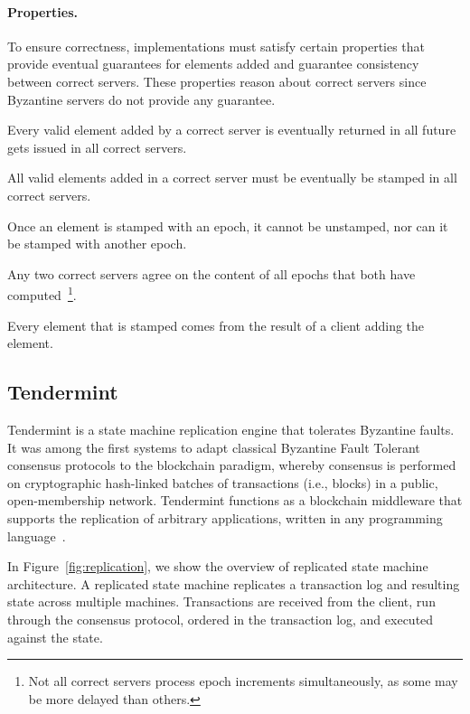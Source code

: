 \paragraph*{Properties.}
To ensure correctness, \setchain implementations must satisfy certain
properties that provide eventual guarantees for elements added and
guarantee consistency between correct servers. 
%
These properties reason about correct servers since Byzantine servers
do not provide any guarantee.

\begin{compactitem}
  \item Every valid element added by a correct
server is eventually returned in all future gets issued in all correct
servers.
  \item All valid elements added in a correct server must be eventually
be stamped in all correct servers.
  \item Once an element is stamped with an epoch, it cannot be unstamped, nor
can it be stamped with another epoch.
\item Any two correct servers agree on the content of
all epochs that both have computed~\footnote{Not all correct servers process epoch increments
simultaneously, as some may be more delayed than others.}.
%
\item Every element that is stamped comes from the result of a client adding the element.
  \end{compactitem}

\subsection{Tendermint}\label{sec:tendermint}
%
Tendermint is a state machine replication engine that tolerates Byzantine faults.
%
It was among the first systems to adapt classical Byzantine Fault Tolerant consensus protocols
to the blockchain paradigm, whereby consensus is performed on cryptographic hash-linked batches of
transactions (i.e., blocks) in a public, open-membership network.
%
Tendermint functions as a blockchain middleware that supports the replication of arbitrary
applications, written in any programming language~\cite{tendermint.design}.

In Figure~\ref{fig:replication}, we show the overview of replicated state machine architecture.
%
A replicated state machine replicates a transaction log and resulting state across multiple machines.
%
Transactions are received from the client, run through the consensus protocol, ordered in the
transaction log, and executed against the state.
%
%

